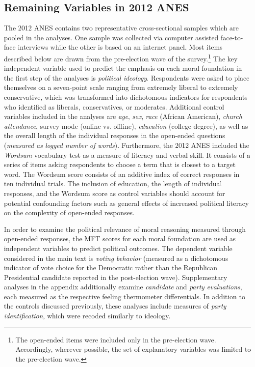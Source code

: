 \clearpage
\subsection{Remaining Variables in 2012 ANES}

The 2012 ANES contains two representative cross-sectional samples which are pooled in the analyses. One sample was collected via computer assisted face-to-face interviews while the other is based on an internet panel. Most items described below are drawn from the pre-election wave of the survey.\footnote{The open-ended items were included only in the pre-election wave. Accordingly, wherever possible, the set of explanatory variables was limited to the pre-election wave.} The key independent variable used to predict the emphasis on each moral foundation in the first step of the analyses is \textit{political ideology}. Respondents were asked to place themselves on a seven-point scale ranging from extremely liberal to extremely conservative, which was transformed into dichotomous indicators for respondents who identified as liberals, conservatives, or moderates. Additional control variables included in the analyses are \textit{age}, \textit{sex}, \textit{race} (African American), \textit{church attendance}, survey mode (online vs. offline), \textit{education} (college degree), as well as the overall length of the individual responses in the open-ended questions (\textit{measured as logged number of words}). Furthermore, the 2012 ANES included the \textit{Wordsum} vocabulary test as a measure of literacy and verbal skill. It consists of a series of items asking respondents to choose a term that is closest to a target word. The Wordsum score consists of an additive index of correct responses in ten individual trials. The inclusion of education, the length of individual responses, and the Wordsum score as control variables should account for potential confounding factors such as general effects of increased political literacy on the complexity of open-ended responses.

In order to examine the political relevance of moral reasoning measured through open-ended responses, the MFT scores for each moral foundation are used as independent variables to predict political outcomes. The dependent variable considered in the main text is \textit{voting behavior} (measured as a dichotomous indicator of vote choice for the Democratic rather than the Republican Presidential candidate reported in the post-election wave). Supplementary analyses in the appendix additionally examine \textit{candidate} and \textit{party evaluations}, each measured as the respective feeling thermometer differentials. In addition to the controls discussed previously, these analyses include measures of \textit{party identification}, which were recoded similarly to ideology.

